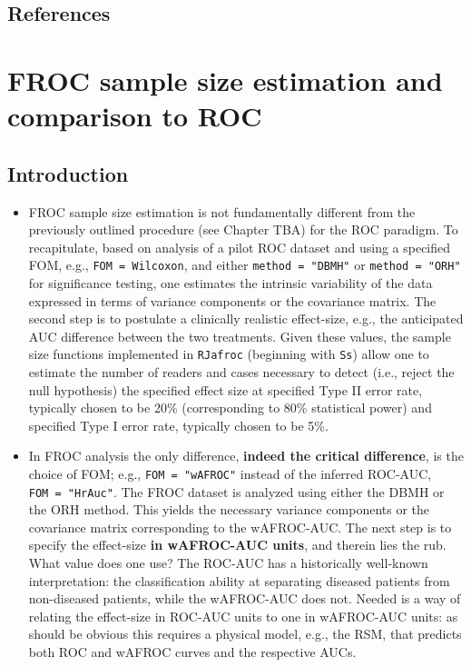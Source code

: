 \documentclass[
]{book}
\begin{document}
\hypertarget{references-7}{%
\section{References}\label{references-7}}

\hypertarget{SSFroc1}{%
\chapter{FROC sample size estimation and comparison to ROC}\label{SSFroc1}}

\hypertarget{introduction-12}{%
\section{Introduction}\label{introduction-12}}

\begin{itemize}
\item
  FROC sample size estimation is not fundamentally different from the previously outlined procedure (see Chapter TBA) for the ROC paradigm. To recapitulate, based on analysis of a pilot ROC dataset and using a specified FOM, e.g., \texttt{FOM\ =\ Wilcoxon}, and either \texttt{method\ =\ "DBMH"} or \texttt{method\ =\ "ORH"} for significance testing, one estimates the intrinsic variability of the data expressed in terms of variance components or the covariance matrix. The second step is to postulate a clinically realistic effect-size, e.g., the anticipated AUC difference between the two treatments. Given these values, the sample size functions implemented in \texttt{RJafroc} (beginning with \texttt{Ss}) allow one to estimate the number of readers and cases necessary to detect (i.e., reject the null hypothesis) the specified effect size at specified Type II error rate, typically chosen to be 20\% (corresponding to 80\% statistical power) and specified Type I error rate, typically chosen to be 5\%.
\item
  In FROC analysis the only difference, \textbf{indeed the critical difference}, is the choice of FOM; e.g., \texttt{FOM\ =\ "wAFROC"} instead of the inferred ROC-AUC, \texttt{FOM\ =\ "HrAuc"}. The FROC dataset is analyzed using either the DBMH or the ORH method. This yields the necessary variance components or the covariance matrix corresponding to the wAFROC-AUC. The next step is to specify the effect-size \textbf{in wAFROC-AUC units}, and therein lies the rub. What value does one use? The ROC-AUC has a historically well-known interpretation: the classification ability at separating diseased patients from non-diseased patients, while the wAFROC-AUC does not. Needed is a way of relating the effect-size in ROC-AUC units to one in wAFROC-AUC units: as should be obvious this requires a physical model, e.g., the RSM, that predicts both ROC and wAFROC curves and the respective AUCs.
\end{itemize}
\end{document}
